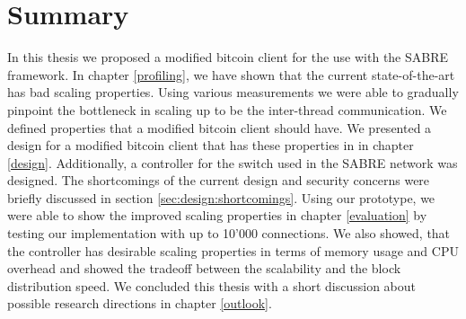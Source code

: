 \chapter{\label{summary}Summary}
In this thesis we proposed a modified bitcoin client for the use with the SABRE framework. In chapter \ref{profiling}, we have shown that the current state-of-the-art has bad scaling properties. Using various measurements we were able to gradually pinpoint the bottleneck in scaling up to be the inter-thread communication. We defined properties that a modified bitcoin client should have. We presented a design for a modified bitcoin client that has these properties in in chapter \ref{design}. Additionally, a controller for the switch used in the SABRE network was designed. The shortcomings of the current design and security concerns were briefly discussed in section \ref{sec:design:shortcomings}. Using our prototype, we were able to show the improved scaling properties in chapter \ref{evaluation} by testing our implementation with up to 10'000 connections. We also showed, that the controller has desirable scaling properties in terms of memory usage and CPU overhead and showed the tradeoff between the scalability and the block distribution speed. We concluded this thesis with a short discussion about possible research directions in chapter \ref{outlook}.

